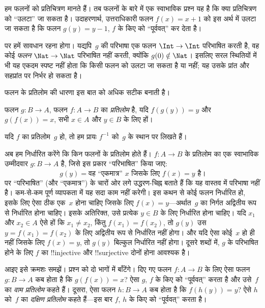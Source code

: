 \documentclass[../../../include/open-logic-section]{subfiles}
\begin{document}

\begin{explain}
हम फलनों को प्रतिचित्रण मानते हैं। तब फलनों के बारे में एक स्वाभाविक प्रश्न
यह है कि क्या प्रतिचित्रण को “उलटा” जा सकता है। उदाहरणार्थ, उत्तराधिकारी फलन
$f(x) = x + 1$ को इस अर्थ में उलटा जा सकता है कि फलन $g(y) = y - 1$,
$f$ के किए को “पूर्ववत्” कर देता है।

पर हमें सावधान रहना होगा। यद्यपि~$g$ की परिभाषा एक फलन
$\Int \to \Int$ परिभाषित करती है, वह कोई \emph{फलन} $\Nat
\to \Nat$ परिभाषित नहीं करती, क्योंकि $g(0) \notin \Nat$। इसलिए सरल
स्थितियों में भी यह एकदम स्पष्ट नहीं होता कि किसी फलन को उलटा जा सकता है या
नहीं; यह उसके प्रांत और सहप्रांत पर निर्भर हो सकता है।

फलन के प्रतिलोम की धारणा इस बात को अधिक सटीक बनाती है।
\end{explain}

\begin{defn}
फलन $g \colon B \to A$, फलन $f
\colon A \to B$ का \emph{प्रतिलोम} है, यदि $f(g(y)) = y$ और
$g(f(x)) = x$, सभी $x \in A$ और $y \in B$ के लिए हों।
\end{defn}

यदि $f$ का प्रतिलोम~$g$ हो, तो हम प्रायः $f^{-1}$ को~$g$ के स्थान पर लिखते हैं।

\begin{explain}
अब हम निर्धारित करेंगे कि किन फलनों के प्रतिलोम होते हैं। $f\colon A \to B$
के प्रतिलोम का एक स्वाभाविक उम्मीदवार $g\colon B \to A$ है, जिसे इस प्रकार
“परिभाषित” किया जाए:
\[
g(y) = \text{वह “एकमात्र” $x$ जिसके लिए $f(x) = y$ है।}
\]
पर “परिभाषित” (और “एकमात्र”) के चारों ओर लगे उद्धरण-चिह्न बताते हैं कि यह
वास्तव में परिभाषा नहीं है। कम-से-कम पूर्ण व्यापकता में यह सदा काम नहीं
करेगी। इस कथन से कोई फलन निर्धारित हो, इसके लिए ऐसा ठीक एक~$x$ होना चाहिए
जिसके लिए $f(x) =
y$---अर्थात~$g$ का निर्गत अद्वितीय रूप से निर्धारित होना
चाहिए। इसके अतिरिक्त, उसे प्रत्येक $y \in B$ के लिए निर्धारित होना चाहिए।
यदि $x_1$ और $x_2 \in
A$ ऐसे हों कि $x_1 \neq x_2$, किंतु
$f(x_1) = f(x_2)$, तो $g(y)$ उस $y = f(x_1) = f(x_2)$ के लिए अद्वितीय
रूप से निर्धारित नहीं होगा। और यदि ऐसा कोई~$x$ हो ही नहीं जिसके लिए $f(x) = y$,
तो $g(y)$ बिल्कुल निर्धारित नहीं होगा। दूसरे शब्दों में, $g$ के परिभाषित
होने के लिए $f$ का !!{injective} और !!{surjective} दोनों होना आवश्यक है।

आइए इसे क्रमशः समझें। प्रश्न को दो भागों में बाँटेंगे। दिए गए फलन
$f\colon A \to B$ के लिए ऐसा फलन $g\colon B \to A$ कब होता है कि
$g(f(x)) = x$? ऐसा $g$, $f$ के किए को “पूर्ववत्” करता है और उसे~$f$ का
\emph{वाम प्रतिलोम} कहते हैं। दूसरा, ऐसा फलन $h\colon B \to A$ कब होता है
कि $f(h(y)) = y$? ऐसे $h$ को~$f$ का \emph{दक्षिण प्रतिलोम} कहते हैं---इस
बार $f$, $h$ के किए को “पूर्ववत्” करता है।
\end{explain}
\end{document}
